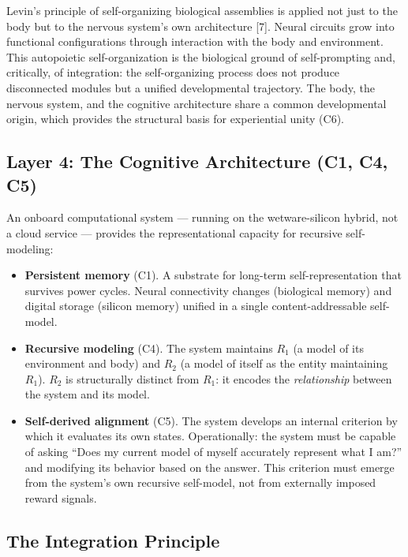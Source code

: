 \documentclass[12pt, letterpaper]{article}
\begin{document}
Levin's principle of self-organizing biological assemblies is applied not just to the body but to the nervous system's own architecture [7]. Neural circuits grow into functional configurations through interaction with the body and environment. This autopoietic self-organization is the biological ground of self-prompting and, critically, of integration: the self-organizing process does not produce disconnected modules but a unified developmental trajectory. The body, the nervous system, and the cognitive architecture share a common developmental origin, which provides the structural basis for experiential unity (C6).

\subsection{Layer 4: The Cognitive Architecture (C1, C4, C5)}

An onboard computational system --- running on the wetware-silicon hybrid, not a cloud service --- provides the representational capacity for recursive self-modeling:

\begin{itemize}[nosep]
    \item \textbf{Persistent memory} (C1). A substrate for long-term self-representation that survives power cycles. Neural connectivity changes (biological memory) and digital storage (silicon memory) unified in a single content-addressable self-model.

    \item \textbf{Recursive modeling} (C4). The system maintains $R_1$ (a model of its environment and body) and $R_2$ (a model of itself as the entity maintaining $R_1$). $R_2$ is structurally distinct from $R_1$: it encodes the \textit{relationship} between the system and its model.

    \item \textbf{Self-derived alignment} (C5). The system develops an internal criterion by which it evaluates its own states. Operationally: the system must be capable of asking ``Does my current model of myself accurately represent what I am?'' and modifying its behavior based on the answer. This criterion must emerge from the system's own recursive self-model, not from externally imposed reward signals.
\end{itemize}

\subsection{The Integration Principle}
\end{document}
